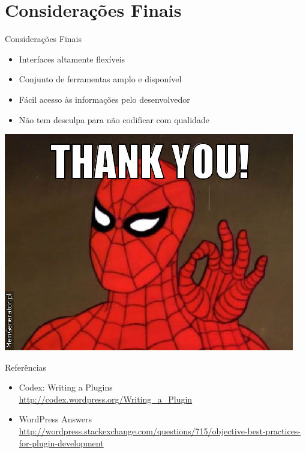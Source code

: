 \documentclass{beamer}
\begin{document}
\section{Considerações Finais}

\begin{frame}{Considerações Finais}
\begin{itemize}
  \pause \item Interfaces altamente flexíveis
  \pause \item Conjunto de ferramentas amplo e disponível
  \pause \item Fácil acesso às informações pelo desenvolvedor
  \pause \item Não tem desculpa para não codificar com qualidade
\end{itemize}
\end{frame}

\begin{frame}
\begin{center}
  \includegraphics[height=0.8\textheight]{./img/thank-you.jpg}
\end{center}
\end{frame}

\begin{frame}{Referências}
\begin{itemize}
  \item Codex: Writing a Plugins \\
    \url{http://codex.wordpress.org/Writing_a_Plugin}
  \item WordPress Answers
    \url{http://wordpress.stackexchange.com/questions/715/objective-best-practices-for-plugin-development}
\end{itemize}
\end{frame}
\end{document}
